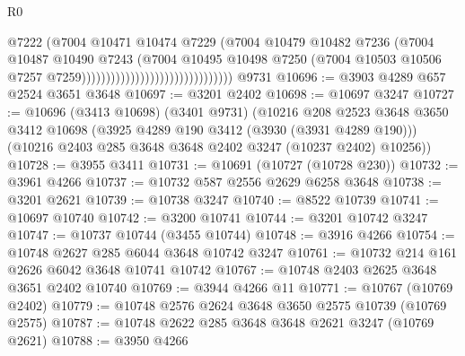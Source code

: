 \begin{lexlean}{R0}
\begin{coremodule}
                                                        @7222
                                                        (@7004
                                                          @10471
                                                          @10474
                                                          @7229
                                                          (@7004
                                                            @10479
                                                            @10482
                                                            @7236
                                                            (@7004
                                                              @10487
                                                              @10490
                                                              @7243
                                                              (@7004
                                                                @10495
                                                                @10498
                                                                @7250
                                                                (@7004
                                                                  @10503
                                                                  @10506
                                                                  @7257
                                                                  @7259)))))))))))))))))))))))))))))))
    @9731
@10696 := @3903 @4289 @657 @2524 @3651 @3648
@10697 := @3201 @2402
@10698 := @10697 @3247
@10727 := @10696
    (@3413 @10698)
    (@3401 @9731)
    (@10216
      @208
      @2523
      @3648
      @3650
      @3412
      @10698
      (@3925 @4289 @190 @3412 (@3930 (@3931 @4289 @190)))
      (@10216 @2403 @285 @3648 @3648 @2402 @3247 (@10237 @2402) @10256))
@10728 := @3955 @3411
@10731 := @10691 (@10727 (@10728 @230))
@10732 := @3961 @4266
@10737 := @10732 @587 @2556 @2629 @6258 @3648
@10738 := @3201 @2621
@10739 := @10738 @3247
@10740 := @8522 @10739
@10741 := @10697 @10740
@10742 := @3200 @10741
@10744 := @3201 @10742 @3247
@10747 := @10737 @10744 (@3455 @10744)
@10748 := @3916 @4266
@10754 := @10748 @2627 @285 @6044 @3648 @10742 @3247
@10761 := @10732 @214 @161 @2626 @6042 @3648 @10741 @10742
@10767 := @10748 @2403 @2625 @3648 @3651 @2402 @10740
@10769 := @3944 @4266 @11
@10771 := @10767 (@10769 @2402)
@10779 := @10748 @2576 @2624 @3648 @3650 @2575 @10739 (@10769 @2575)
@10787 := @10748 @2622 @285 @3648 @3648 @2621 @3247 (@10769 @2621)
@10788 := @3950 @4266

\end{coremodule}
\end{lexlean}
